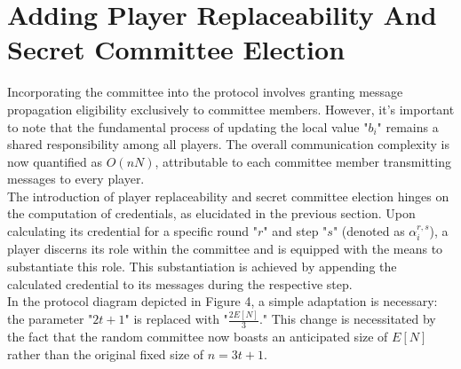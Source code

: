 \section{Adding Player Replaceability And Secret Committee Election}
Incorporating the committee into the protocol involves granting message propagation eligibility exclusively to committee members. However, it's important to note that the fundamental process of updating the local value "$b_{i}$" remains a shared responsibility among all players. The overall communication complexity is now quantified as $O(nN)$, attributable to each committee member transmitting messages to every player.\\
The introduction of player replaceability and secret committee election hinges on the computation of credentials, as elucidated in the previous section. Upon calculating its credential for a specific round "$r$" and step "$s$" (denoted as $\alpha_{i}^{r, s}$), a player discerns its role within the committee and is equipped with the means to substantiate this role. This substantiation is achieved by appending the calculated credential to its messages during the respective step.\\
In the protocol diagram depicted in Figure 4, a simple adaptation is necessary: the parameter "$2t + 1$" is replaced with "$\frac{2E[N]}{3}$." This change is necessitated by the fact that the random committee now boasts an anticipated size of $E[N]$ rather than the original fixed size of $n = 3t + 1$.
